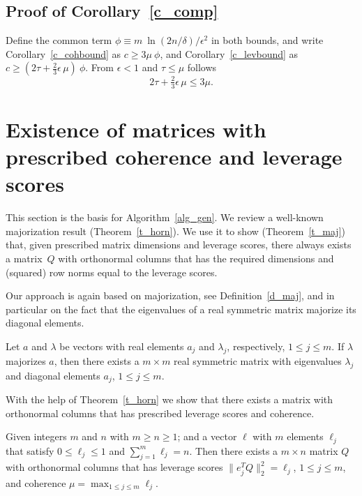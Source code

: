 \documentclass{siamltex}
\begin{document}
\subsection{Proof of Corollary~\ref{c_comp}}\label{s_compproof}
Define the common term 
$\phi\equiv m\>\ln(2n/\delta)/\epsilon^2$
in both bounds, and write Corollary~\ref{c_cohbound} as
$c\geq  3\mu\>\phi$,
and Corollary~\ref{c_levbound} as
$c\geq  (2\tau+\tfrac{2}{3}\epsilon\,\mu)\>\phi$.
From $\epsilon<1$ and $\tau\leq \mu$ follows
$$2\tau+\tfrac{2}{3}\epsilon\,\mu\leq 3\mu.$$

 

\section{Existence of matrices with prescribed coherence and 
leverage scores}\label{s_pre}
This section is the basis for Algorithm~\ref{alg_gen}.
We review a well-known majorization result (Theorem~\ref{t_horn}). 
We use it to show (Theorem~\ref{t_maj}) that, given prescribed matrix 
dimensions and leverage scores, there always exists a
matrix~$Q$ with orthonormal columns that has the required dimensions
and (squared) row norms equal to the leverage scores.

Our approach is again based on majorization, see Definition~\ref{d_maj},
and in particular on the fact that the eigenvalues of
a real symmetric matrix majorize its diagonal elements.

\begin{theorem}\label{t_horn}
Let $a$ and $\lambda$ be  vectors with real elements 
$a_j$ and $\lambda_j$, respectively, $1\leq j\leq m$.
If $\lambda$ majorizes $a$, then there exists 
a $m\times m$ real symmetric matrix with 
eigenvalues $\lambda_j$ and diagonal elements $a_j$, $1\leq j\leq m$.
\end{theorem}

With the help of Theorem~\ref{t_horn} we show that there exists
a matrix with orthonormal columns that has prescribed leverage scores and
coherence.

\begin{theorem}\label{t_maj}
Given integers $m$ and $n$ with $m\geq n\geq 1$; 
and a vector $\ell$ with $m$ elements $\ell_j$ that satisfy
$0\leq \ell_j \leq 1$ and $\sum_{j=1}^m{\ell_j}=n$. Then
there exists a $m\times n$ matrix $Q$ with orthonormal 
columns that has leverage scores $\|e_j^TQ\|_2^2=\ell_j$, $1\leq j\leq m$,
and coherence $\mu=\max_{1\leq j\leq m}{\ell_j}$.
\end{theorem}
\end{document}
